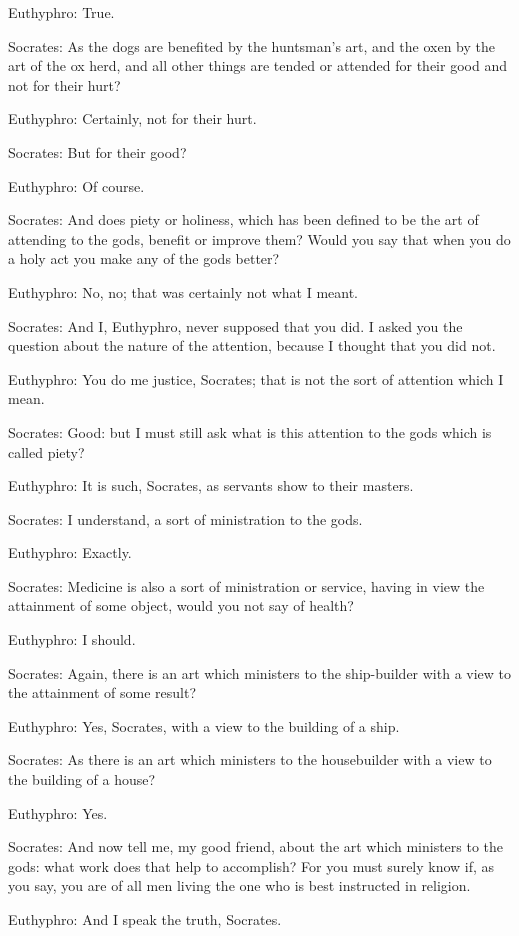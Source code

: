 Euthyphro: True.

Socrates: As the dogs are benefited by the huntsman's art, and the oxen by the art of the ox herd, and all other things are tended or attended for their good and not for their hurt?

Euthyphro: Certainly, not for their hurt.

Socrates: But for their good?

Euthyphro: Of course.

Socrates: And does piety or holiness, which has been defined to be the art of attending to the gods, benefit or improve them? Would you say that when you do a holy act you make any of the gods better?

Euthyphro: No, no; that was certainly not what I meant.

Socrates: And I, Euthyphro, never supposed that you did. I asked you the question about the nature of the attention, because I thought that you did not.

Euthyphro: You do me justice, Socrates; that is not the sort of attention which I mean.

Socrates: Good: but I must still ask what is this attention to the gods which is called piety?

Euthyphro: It is such, Socrates, as servants show to their masters.

Socrates: I understand, a sort of ministration to the gods.

Euthyphro: Exactly.

Socrates: Medicine is also a sort of ministration or service, having in view the attainment of some object, would you not say of health?

Euthyphro: I should.

Socrates: Again, there is an art which ministers to the ship-builder with a view to the attainment of some result?

Euthyphro: Yes, Socrates, with a view to the building of a ship.

Socrates: As there is an art which ministers to the housebuilder with a view to the building of a house?

Euthyphro: Yes.

Socrates: And now tell me, my good friend, about the art which ministers to the gods: what work does that help to accomplish? For you must surely know if, as you say, you are of all men living the one who is best instructed in religion.

Euthyphro: And I speak the truth, Socrates.

